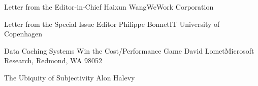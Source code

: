 \documentclass[11pt]{article}
\begin{document}


\begin{bulletin}


%
%

\begin{lettersection}


\begin{letter}{Letter from the Editor-in-Chief}
{Haixun Wang}{WeWork Corporation}

\end{letter}
%
\newpage
%
%
\begin{letter}{Letter from the Special Issue Editor}
{Philippe Bonnet}{IT University of Copenhagen}


\end{letter}

\end{lettersection}


\begin{opinionsection}
\begin{opinion}{Data Caching Systems Win the Cost/Performance Game}
{David Lomet}{Microsoft Research, Redmond, WA 98052}

\end{opinion}
\begin{opinion}{The Ubiquity of Subjectivity}
{Alon Halevy}{}

\end{opinion}
\end{opinionsection}





\end{bulletin}
\end{document}
